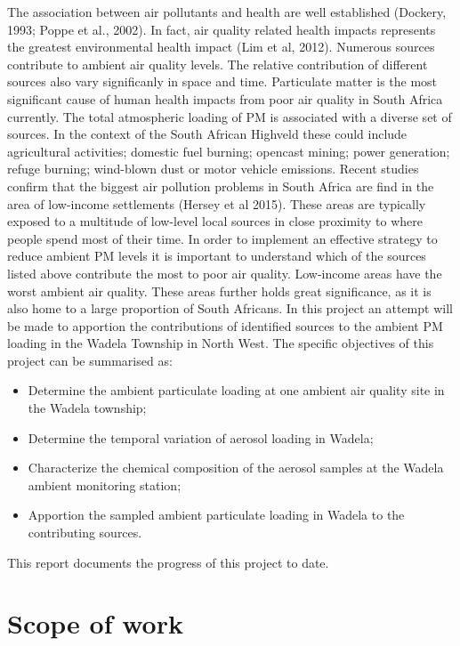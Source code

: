 \documentclass{nwureport}
\begin{document}
The association between air pollutants and health are well established (Dockery, 1993; Poppe et al., 2002). In fact, air quality related health impacts represents the greatest environmental health impact (Lim et al, 2012). Numerous sources contribute to ambient air quality levels. The relative contribution of different sources also vary significanly in space and time. Particulate matter is the most significant cause of human health impacts from poor air quality in South Africa currently. The total atmospheric loading of PM is associated with a diverse set of sources. In the context of the South African Highveld these could include agricultural activities; domestic fuel burning; opencast mining; power generation; refuge burning; wind-blown dust or motor vehicle emissions. Recent studies confirm that the biggest air pollution problems in South Africa are find in the area of low-income settlements (Hersey et al 2015). These areas are typically exposed to a multitude of low-level local sources in close proximity to where people spend most of their time. In order to implement an effective strategy to reduce ambient PM levels it is important to understand which of the sources listed above contribute the most to poor air quality. Low-income areas have the worst ambient air quality. These areas further holds great significance, as it is also home to a large proportion of South Africans. In this project an attempt will be made to apportion the contributions of identified sources to the ambient PM loading in the Wadela Township in North West. The specific objectives of this project can be summarised as:

\begin{itemize}
\item Determine the ambient particulate loading at one ambient air quality site in the Wadela township;
\item Determine the temporal variation of aerosol loading in Wadela;
\item Characterize the chemical composition of the aerosol samples at the Wadela ambient monitoring station;
\item Apportion the sampled ambient particulate loading in Wadela to the contributing sources.
\end{itemize}

This report documents the progress of this project to date.

\section{Scope of work}
\end{document}
